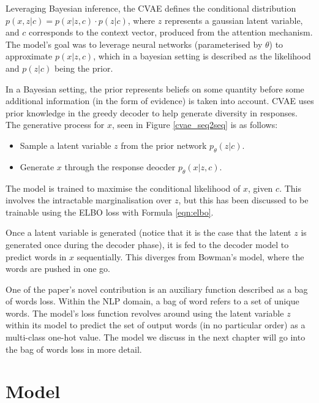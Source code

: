\documentclass[12pt,twoside]{report}
\begin{document}
Leveraging Bayesian inference, the CVAE defines the conditional distribution $p(x,z|c) = p(x|z,c)\cdot p(z|c)$, where $z$ represents a gaussian latent variable, and $c$ corresponds to the context vector, produced from the attention mechanism. The model's goal was to leverage neural networks (parameterised by $\theta$) to approximate $p(x|z,c)$, which in a bayesian setting is described as the likelihood and $p(z|c)$ being the prior. 

In a Bayesian setting, the prior represents beliefs on some quantity before some additional information (in the form of evidence) is taken into account. CVAE uses prior knowledge in the greedy decoder to help generate diversity in responses. The generative process for $x$, seen in Figure \ref{cvae_seq2seq} is as follows:

\begin{itemize}
	\item Sample a latent variable $z$ from the prior network $p_\theta (z|c)$.
	\item Generate $x$ through the response deocder $p_\theta(x|z,c)$.
\end{itemize}

The model is trained to maximise the conditional likelihood of $x$, given $c$. This involves the intractable marginalisation over $z$, but this has been discussed to be trainable using the ELBO loss with Formula \ref{eqn:elbo}. 

Once a latent variable is generated (notice that it is the case that the latent $z$ is generated once during the decoder phase), it is fed to the decoder model to predict words in $x$ sequentially. This diverges from Bowman's model, where the words are pushed in one go. 

One of the paper's novel contribution is an auxiliary function described as a bag of words loss. Within the NLP domain, a bag of word refers to a set of unique words. The model's loss function revolves around using the latent variable $z$ within its model to predict the set of output words (in no particular order) as a multi-class one-hot value. The model we discuss in the next chapter will go into the bag of words loss in more detail.


\chapter{Model}

\end{document}
